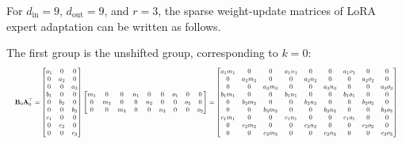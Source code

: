 \documentclass[a4paper,11pt]{article}
\begin{document}
For $d_{\mathrm{in}}=9$, $d_{\mathrm{out}}=9$, and $r=3$, the sparse weight-update matrices of LoRA expert adaptation can be written as follows.

The first group is the unshifted group, corresponding to $k=0$:
\[
\resizebox{\linewidth}{!}{$\displaystyle
\mathbf{B}_0 \mathbf{A}_0^\top =
\begin{bmatrix}
a_1 & 0 & 0 \\ 0 & a_2 & 0 \\ 0 & 0 & a_3 \\
b_1 & 0 & 0 \\ 0 & b_2 & 0 \\ 0 & 0 & b_3 \\
c_1 & 0 & 0 \\ 0 & c_2 & 0 \\ 0 & 0 & c_3
\end{bmatrix}
\begin{bmatrix}
m_1 & 0 & 0 & n_1 & 0 & 0 & o_1 & 0 & 0 \\
0 & m_2 & 0 & 0 & n_2 & 0 & 0 & o_2 & 0 \\
0 & 0 & m_3 & 0 & 0 & n_3 & 0 & 0 & o_3
\end{bmatrix}
=
\begin{bmatrix}
a_1 m_1 & 0 & 0 & a_1 n_1 & 0 & 0 & a_1 o_1 & 0 & 0 \\
0 & a_2 m_2 & 0 & 0 & a_2 n_2 & 0 & 0 & a_2 o_2 & 0 \\
0 & 0 & a_3 m_3 & 0 & 0 & a_3 n_3 & 0 & 0 & a_3 o_3 \\
b_1 m_1 & 0 & 0 & b_1 n_1 & 0 & 0 & b_1 o_1 & 0 & 0 \\
0 & b_2 m_2 & 0 & 0 & b_2 n_2 & 0 & 0 & b_2 o_2 & 0 \\
0 & 0 & b_3 m_3 & 0 & 0 & b_3 n_3 & 0 & 0 & b_3 o_3 \\
c_1 m_1 & 0 & 0 & c_1 n_1 & 0 & 0 & c_1 o_1 & 0 & 0 \\
0 & c_2 m_2 & 0 & 0 & c_2 n_2 & 0 & 0 & c_2 o_2 & 0 \\
0 & 0 & c_3 m_3 & 0 & 0 & c_3 n_3 & 0 & 0 & c_3 o_3
\end{bmatrix}
$}
\]
\end{document}
